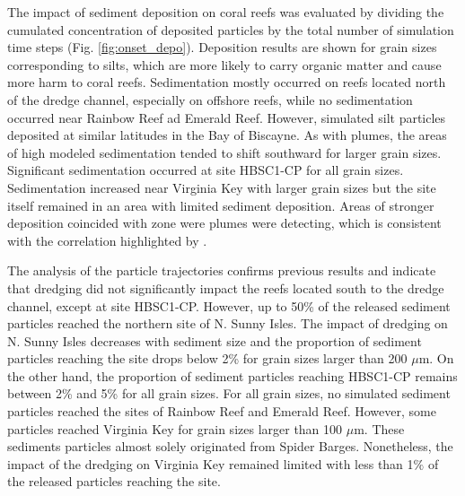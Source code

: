 \documentclass[preprint,12pt,authoryear]{elsarticle}
\begin{document}
The impact of sediment deposition on coral reefs was evaluated by dividing the cumulated concentration of deposited particles by the total number of simulation time steps (Fig. \ref{fig:onset_depo}). Deposition results are shown for grain sizes corresponding to silts, which are more likely to carry organic matter and cause more harm to coral reefs. Sedimentation mostly occurred on reefs located north of the dredge channel, especially on offshore reefs, while no sedimentation occurred  near Rainbow Reef ad Emerald Reef. However, simulated silt particles  deposited at similar latitudes in the Bay of Biscayne. As with plumes, the areas of high modeled sedimentation tended to shift southward for larger grain sizes. Significant sedimentation occurred at site HBSC1-CP for all grain sizes. Sedimentation increased near Virginia Key with larger grain sizes but the site itself remained in an area with limited sediment deposition. Areas of stronger deposition coincided with zone were plumes were detecting, which is consistent with the correlation highlighted by \cite{cunning2019extensive}.

The analysis of the particle trajectories confirms previous results and indicate that dredging did not significantly impact the reefs located south to the dredge channel, except at site HBSC1-CP. However, up to 50\% of the released sediment particles reached the northern site of N. Sunny Isles. The impact of dredging on N. Sunny Isles decreases with sediment size and the proportion of sediment particles reaching the site drops below 2\% for grain sizes larger than 200 $\mu$m. On the other hand, the proportion of sediment particles reaching HBSC1-CP remains between 2\% and 5\% for all grain sizes. For all grain sizes, no simulated sediment particles reached the sites of Rainbow Reef and Emerald Reef. However, some particles reached Virginia Key for grain sizes larger than 100 $\mu$m. These sediments particles almost solely originated from Spider Barges. Nonetheless, the impact of the dredging on Virginia Key remained limited with less than 1$\%$ of the released particles reaching the site.
\end{document}
